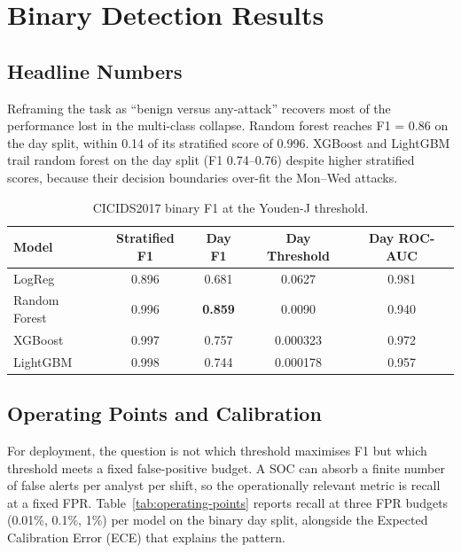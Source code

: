 \chapter{Binary Detection Results}
\label{ch:binary}

\section{Headline Numbers}

Reframing the task as ``benign versus any-attack'' recovers most of the
performance lost in the multi-class collapse. Random forest reaches
F1 = 0.86 on the day split, within 0.14 of its stratified score of 0.996.
XGBoost and LightGBM trail random forest on the day split (F1
0.74--0.76) despite higher stratified scores, because their decision
boundaries over-fit the Mon--Wed attacks.

\begin{table}[H]
    \centering
    \caption{CICIDS2017 binary F1 at the Youden-J threshold.}
    \label{tab:binary-headline}
    \small
    \begin{tabular}{lcccc}
        \toprule
        \textbf{Model} & \textbf{Stratified F1} & \textbf{Day F1} & \textbf{Day Threshold} & \textbf{Day ROC-AUC} \\
        \midrule
        LogReg & 0.896 & 0.681 & 0.0627 & 0.981 \\
        Random Forest & 0.996 & \textbf{0.859} & 0.0090 & 0.940 \\
        XGBoost & 0.997 & 0.757 & 0.000323 & 0.972 \\
        LightGBM & 0.998 & 0.744 & 0.000178 & 0.957 \\
        \bottomrule
    \end{tabular}
\end{table}


\section{Operating Points and Calibration}
\label{sec:operating-points}

For deployment, the question is not which threshold maximises F1 but
which threshold meets a fixed false-positive budget. A SOC can absorb a
finite number of false alerts per analyst per shift, so the
operationally relevant metric is recall at a fixed FPR.
Table~\ref{tab:operating-points} reports recall at three FPR budgets
(0.01\%, 0.1\%, 1\%) per model on the binary day split, alongside the
Expected Calibration Error (ECE) that explains the pattern.

